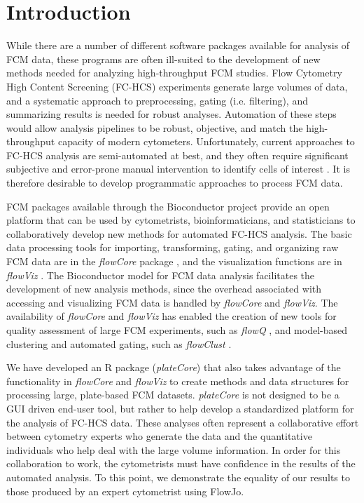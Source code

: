 \documentclass[12pt]{article}
\newcommand{\Rpackage}[1]{{\textit{#1}}}
\begin{document}
\clearpage
\section*{Introduction}

While there are a number of different software packages available for analysis of FCM data, these programs are often
ill-suited to the development of new methods needed for analyzing high-throughput FCM studies.
Flow Cytometry High Content Screening (FC-HCS) experiments generate large volumes of data, and a systematic approach to
preprocessing, gating (i.e. filtering), and summarizing results is needed for robust analyses. 
Automation of these steps would allow analysis pipelines to be robust, objective, and match the high-throughput capacity of modern cytometers. 
Unfortunately, current approaches to FC-HCS analysis are semi-automated at best,
and they often require significant subjective and error-prone manual intervention to identify cells of interest \citep{Maecker2005}.
It is therefore desirable to develop programmatic approaches to process FCM data.

FCM packages available through the Bioconductor \citep{BIOC} project provide an open platform that
can be used by cytometrists, bioinformaticians, and statisticians to collaboratively develop new methods for
automated FC-HCS analysis.  The basic data processing tools for importing, transforming, gating, and
organizing raw FCM data are in the \Rpackage{flowCore} package \citep{hahne2009}, and the visualization functions are
in \Rpackage{flowViz} \citep{sarkar2008ufv}. The Bioconductor model for FCM data analysis facilitates
the development of new analysis methods, since the overhead associated with
accessing and visualizing FCM data is handled by \Rpackage{flowCore} and \Rpackage{flowViz}.
The availability of \Rpackage{flowCore} and \Rpackage{flowViz} has enabled the creation of new tools for
quality assessment of large FCM experiments, such as \Rpackage{flowQ} \citep{lemeurFQ}, and model-based clustering and automated
gating, such as \Rpackage{flowClust} \citep{lo2008}.

We have developed an R package (\Rpackage{plateCore}) that also takes advantage of the functionality in \Rpackage{flowCore} and \Rpackage{flowViz}
to create methods and data structures for processing large, plate-based FCM datasets.  
\Rpackage{plateCore} is not designed to be a GUI driven end-user tool, but rather to help develop a standardized platform for the analysis of FC-HCS data.
These analyses often represent a collaborative effort between cytometry experts who generate the data and the quantitative individuals who help
deal with the large volume information. In order for this collaboration to work, the cytometrists must have confidence in the
results of the automated analysis. To this point, we demonstrate the equality of our results to those produced by an expert
cytometrist using FlowJo.
\end{document}
